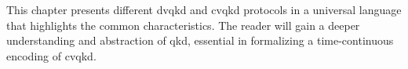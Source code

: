 This chapter presents different \gls{dvqkd} and \gls{cvqkd} protocols in a universal language that highlights the common characteristics.
The reader will gain a deeper understanding and abstraction of \gls{qkd}, essential in formalizing a time-continuous encoding of \gls{cvqkd}.